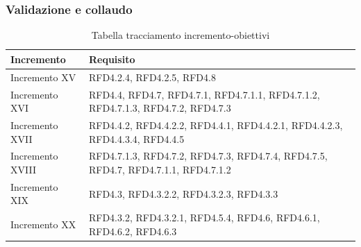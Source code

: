 \documentclass[../piano_di_progetto.tex]{subfiles}
\begin{document}
\subsubsection*{Validazione e collaudo}
\begin{table}[!ht]
	\centering
	\begin{tabular}{|p{3cm}|p{6.5cm}|}
	\hline
	\rowcolor{lightgray}
    \textbf{Incremento} & \textbf{Requisito}\\
    \hline
        Incremento XV & RFD4.2.4, RFD4.2.5, RFD4.8 \\
        Incremento XVI & RFD4.4, RFD4.7, RFD4.7.1, RFD4.7.1.1, RFD4.7.1.2, RFD4.7.1.3, RFD4.7.2, RFD4.7.3 \\
        Incremento XVII & RFD4.4.2, RFD4.4.2.2, RFD4.4.1, RFD4.4.2.1, RFD4.4.2.3, RFD4.4.3.4, RFD4.4.5 \\
        Incremento XVIII & RFD4.7.1.3, RFD4.7.2, RFD4.7.3, RFD4.7.4, RFD4.7.5, RFD4.7, RFD4.7.1.1, RFD4.7.1.2 \\
        Incremento XIX & RFD4.3, RFD4.3.2.2, RFD4.3.2.3, RFD4.3.3 \\
        Incremento XX & RFD4.3.2, RFD4.3.2.1, RFD4.5.4, RFD4.6, RFD4.6.1, RFD4.6.2, RFD4.6.3 \\	   
    \hline	
	\end{tabular}
	\caption{Tabella tracciamento incremento-obiettivi}
\end{table}
\end{document}
